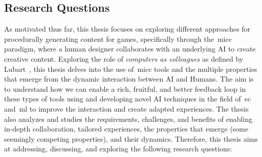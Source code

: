 

\subsection{Research Questions} \label{sec:RQS}

As motivated thus far, this thesis focuses on exploring different approaches for procedurally generating content for games, specifically through the~\acrshort{micc} paradigm, where a human designer collaborates with an underlying AI to create creative content. Exploring the role of \emph{computers as colleagues} as defined by Lubart~\cite{lubart_how_2005}, this thesis delves into the use of~\acrshort{micc} tools and the multiple properties that emerge from the dynamic interaction between AI and Humans. The aim is to understand how we can enable a rich, fruitful, and better feedback loop in these types of tools using and developing novel AI techniques in the field of~\acrlong{ec} and~\acrlong{ml} to improve the interaction and create adapted experiences. The thesis also analyzes and studies the requirements, challenges, and benefits of enabling in-depth collaboration, tailored experiences, the properties that emerge (some seemingly competing properties), and their dynamics. Therefore, this thesis aims at addressing, discussing, and exploring the following research questions: 

